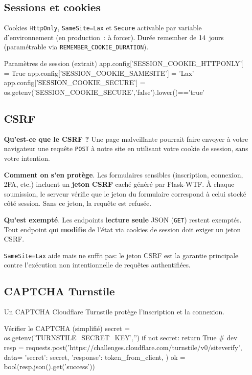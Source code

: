 \subsection*{Sessions et cookies}
\noindent Cookies \texttt{HttpOnly}, \texttt{SameSite=Lax} et \texttt{Secure} activable par variable d'environnement (en production : à forcer). Durée \og remember \fg{} de 14~jours (paramétrable via \texttt{REMEMBER\_COOKIE\_DURATION}).
\begin{codebox}[language=Python]{Paramètres de session (extrait)}
app.config['SESSION_COOKIE_HTTPONLY'] = True
app.config['SESSION_COOKIE_SAMESITE'] = 'Lax'
app.config['SESSION_COOKIE_SECURE'] = os.getenv('SESSION_COOKIE_SECURE','false').lower()=='true'
\end{codebox}

\subsection*{CSRF}
\noindent \textbf{Qu'est-ce que le CSRF ?} Une page malveillante pourrait faire envoyer à votre navigateur une requête \texttt{POST} à notre site en utilisant votre cookie de session, sans votre intention.

\noindent \textbf{Comment on s'en protège}. Les formulaires sensibles (inscription, connexion, 2FA, etc.) incluent un \textbf{jeton CSRF} caché généré par Flask-WTF. À chaque soumission, le serveur vérifie que le jeton du formulaire correspond à celui stocké côté session. Sans ce jeton, la requête est refusée.

\noindent \textbf{Qu'est exempté}. Les endpoints \textbf{lecture seule} JSON (\texttt{GET}) restent exemptés. Tout endpoint qui \textbf{modifie} de l'état via cookies de session doit exiger un jeton CSRF.

\noindent \texttt{SameSite=Lax} aide mais ne suffit pas: le jeton CSRF est la garantie principale contre l'exécution non intentionnelle de requêtes authentifiées.

\subsection*{CAPTCHA Turnstile}
\noindent Un CAPTCHA Cloudflare Turnstile protège l'inscription et la connexion.
\begin{codebox}[language=Python]{Vérifier le CAPTCHA (simplifié)}
secret = os.getenv('TURNSTILE_SECRET_KEY','')
if not secret: return True  # dev
resp = requests.post('https://challenges.cloudflare.com/turnstile/v0/siteverify', data={
    'secret': secret,
    'response': token_from_client,
})
ok = bool(resp.json().get('success'))
\end{codebox}


